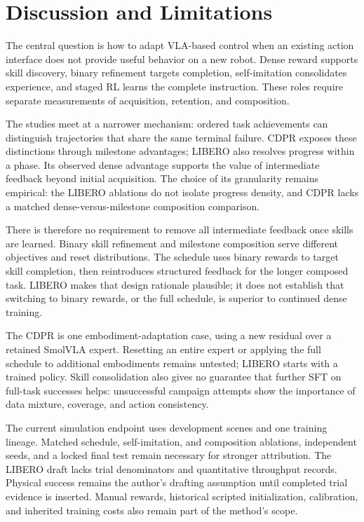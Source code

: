 \section{Discussion and Limitations}\label{sec:discussion}
The central question is how to adapt VLA-based control when an existing action interface does not provide useful behavior on a new robot. Dense reward supports skill discovery, binary refinement targets completion, self-imitation consolidates experience, and staged RL learns the complete instruction. These roles require separate measurements of acquisition, retention, and composition.

The studies meet at a narrower mechanism: ordered task achievements can distinguish trajectories that share the same terminal failure. CDPR exposes these distinctions through milestone advantages; LIBERO also resolves progress within a phase. Its observed dense advantage supports the value of intermediate feedback beyond initial acquisition. The choice of its granularity remains empirical: the LIBERO ablations do not isolate progress density, and CDPR lacks a matched dense-versus-milestone composition comparison.

There is therefore no requirement to remove all intermediate feedback once skills are learned. Binary skill refinement and milestone composition serve different objectives and reset distributions. The schedule uses binary rewards to target skill completion, then reintroduces structured feedback for the longer composed task. LIBERO makes that design rationale plausible; it does not establish that switching to binary rewards, or the full schedule, is superior to continued dense training.

The CDPR is one embodiment-adaptation case, using a new residual over a retained SmolVLA expert. Resetting an entire expert or applying the full schedule to additional embodiments remains untested; LIBERO starts with a trained policy. Skill consolidation also gives no guarantee that further SFT on full-task successes helps: unsuccessful campaign attempts show the importance of data mixture, coverage, and action consistency.

The current simulation endpoint uses development scenes and one training lineage. Matched schedule, self-imitation, and composition ablations, independent seeds, and a locked final test remain necessary for stronger attribution. The LIBERO draft lacks trial denominators and quantitative throughput records. Physical success remains the author's drafting assumption until completed trial evidence is inserted. Manual rewards, historical scripted initialization, calibration, and inherited training costs also remain part of the method's scope.
